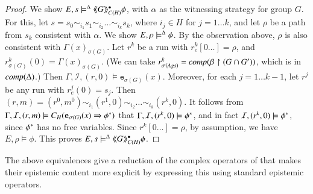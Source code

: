 \documentclass[a4wide]{article}
\theoremstyle{examplesty}
\newcommand{\strat}{\sigma}
\newcommand{\Ags}{\mathit{Ags}}
\newcommand{\I}{\mathcal{I}}
\newcommand{\atlop}[1]{\langle\hspace{-2pt}\langle #1 \rangle \hspace{-2pt}\rangle }
\newcommand{\lid}[2]{\mathtt{e}_{#1}(#2)}
\newcommand{\rimp}{\Rightarrow}
\newcommand{\Env}{E}
\newcommand{\restrict}{\upharpoonright}
\begin{document}
\begin{proof}
We show $\Env, s \models^\GStrats \atlop{G}^\bullet_{C(H)}\phi$, with $\alpha$ as the witnessing strategy for group $G$. 
For this, let 
$s = s_0 \sim_{i_1} s_1  \sim_{i_2} \ldots \sim_{i_k} s_k$, 
where $i_j \in H$ for $j = 1\ldots k$, 
and let $\rho$ be a path from $s_k$ consistent with $\alpha$. 
We show $E, \rho \models^\Delta \phi$. 
By the observation above, $\rho$ is 
also consistent with $ \Gamma(x)_{\strat(G)}$. 
Let $r^k$ be a run  with $r^k_e[0\ldots] = \rho$, and  $r^k_{\strat(G)}(0) =  \Gamma(x)_{\strat(G)}$. 
(We can take $r^k_{\strat(\Ags)} = \compl{\beta \restrict (G\cap G')}$, which is in $\mathit{comp}(\Delta)$.)  
Then $\Gamma,\I,(r,0)\models \lid{\strat(G)}{x}$. 
Moreover, for each $j = 1 \ldots k-1$, let $r^j$ be any run with $r^j_e(0) = s_j$. 
Then $(r,m) = (r^0,m^0) \sim_{i_1} (r^1,0) \sim_{i_2} \ldots  \sim_{i_k} (r^k,0)$. 
It follows from $\Gamma, \I, (r,m)\models   C_{H}(\lid{\strat(G)}{x} \rimp \trl{\phi})$ that 
$\Gamma, \I, (r^k,0)\models  \trl{\phi}$, 
and in fact $\I, (r^k,0)\models  \trl{\phi}$, since $\phi^*$ 
has no free variables. 
Since $r^k[0\ldots ] = \rho$, by assumption, we have $E,\rho \models \phi$. 
This proves  $\Env, s \models^\GStrats \atlop{G}^\bullet_{C(H)}\phi$. 
\end{proof} 




The above equivalences give 
 a reduction of the complex operators of  \cite{JvdH2004}
that makes their epistemic content more explicit by expressing this using standard epistemic operators. 
\end{document}
